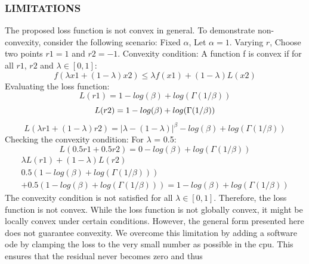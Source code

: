 \subsubsection*{LIMITATIONS}

The proposed loss function is not convex in general. 
To demonstrate non-convexity, consider the following scenario:
Fixed $\alpha$, Let $\alpha = 1$.
Varying $r$, Choose two points $r1 = 1$ and $r2 = -1$.
Convexity condition: A function f is convex if for all $r1$, $r2$ and $\lambda \in [0, 1]$:
\begin{equation*}
    f(\lambda x1 + (1-\lambda) x2) \leq \lambda f(x1) + (1-\lambda)L(x2)
\end{equation*}
Evaluating the loss function:
\begin{equation*}
L(r1) = 1 - log(\beta) + log(\Gamma(1/\beta))
\end{equation*}
\begin{equation*}
L(r2) = 1 - log(\beta) + log(\Gamma(1/\beta)) \\
\end{equation*}
\begin{equation*}
L(\lambda r1 + (1-\lambda)r2) = | \lambda - (1-\lambda)|^\beta - log(\beta) + log(\Gamma(1/\beta))
\end{equation*}
Checking the convexity condition:
For $\lambda$ = 0.5:
\begin{equation*}
   L(0.5r1 + 0.5r2) = 0 - log(\beta) + log(\Gamma(1/\beta)) 
\end{equation*}
\begin{multline*}
\lambda L(r1) + (1-\lambda)L(r2) \\ 
0.5(1 - log(\beta) + log(\Gamma(1/\beta))) \\ + 0.5(1 - log(\beta) + log(\Gamma(1/\beta))) = 1 - log(\beta) + log(\Gamma(1/\beta))
\end{multline*}
The convexity condition is not satisfied for all $\lambda \in [0, 1]$. Therefore, the loss function is not convex.
While the loss function is not globally convex, it might be locally convex under certain conditions. However, the general form presented here does not guarantee convexity. 
We overcome this limitation by adding a software ode by clamping the loss to the very small number as possible in the cpu. This ensures that the residual never becomes zero and thus 
